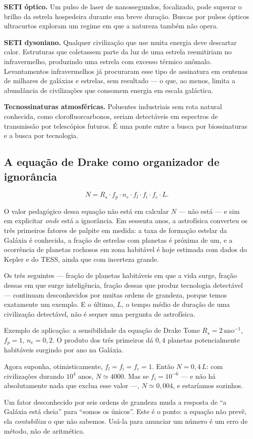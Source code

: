 \documentclass[11pt,a4paper]{article}
\begin{document}
\textbf{SETI óptico.} Um pulso de laser de nanossegundos, focalizado, pode superar o brilho da estrela hospedeira durante sua breve duração. Buscas por pulsos ópticos ultracurtos exploram um regime em que a natureza também não opera.

\textbf{SETI dysoniano.} Qualquer civilização que use muita energia deve descartar calor. Estruturas que coletassem parte da luz de uma estrela reemitiriam no infravermelho, produzindo uma estrela com excesso térmico anômalo. Levantamentos infravermelhos já procuraram esse tipo de assinatura em centenas de milhares de galáxias e estrelas, sem resultado --- o que, ao menos, limita a abundância de civilizações que consomem energia em escala galáctica.

\textbf{Tecnossinaturas atmosféricas.} Poluentes industriais sem rota natural conhecida, como clorofluorcarbonos, seriam detectáveis em espectros de transmissão por telescópios futuros. É uma ponte entre a busca por biossinaturas e a busca por tecnologia.

\subsection*{A equação de Drake como organizador de ignorância}

\[
N=R_\star\cdot f_p\cdot n_e\cdot f_l\cdot f_i\cdot f_c\cdot L.
\]

O valor pedagógico dessa equação não está em calcular $N$ --- não está --- e sim em explicitar \emph{onde} está a ignorância. Em sessenta anos, a astrofísica converteu os três primeiros fatores de palpite em medida: a taxa de formação estelar da Galáxia é conhecida, a fração de estrelas com planetas é próxima de um, e a ocorrência de planetas rochosos em zona habitável é hoje estimada com dados do Kepler e do TESS, ainda que com incerteza grande.

Os três seguintes --- fração de planetas habitáveis em que a vida surge, fração dessas em que surge inteligência, fração dessas que produz tecnologia detectável --- continuam desconhecidos por muitas ordens de grandeza, porque temos exatamente um exemplo. E o último, $L$, o tempo médio de duração de uma civilização detectável, não é sequer uma pergunta de astrofísica.

\begin{lessonblock}{Exemplo de aplicação: a sensibilidade da equação de Drake}
Tome $R_\star=2\,\mathrm{ano^{-1}}$, $f_p=1$, $n_e=0{,}2$. O produto dos três primeiros dá $0{,}4$ planetas potencialmente habitáveis surgindo por ano na Galáxia.

Agora suponha, otimisticamente, $f_l=f_i=f_c=1$. Então $N=0{,}4\,L$: com civilizações durando $10^4$ anos, $N\simeq4000$. Mas se $f_i=10^{-6}$ --- e não há absolutamente nada que exclua esse valor ---, $N\simeq0{,}004$, e estaríamos sozinhos.

Um fator desconhecido por seis ordens de grandeza muda a resposta de ``a Galáxia está cheia'' para ``somos os únicos''. Este é o ponto: a equação não prevê, ela \emph{contabiliza} o que não sabemos. Usá-la para anunciar um número é um erro de método, não de aritmética.
\end{lessonblock}
\end{document}
